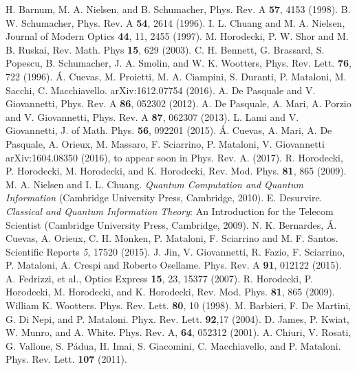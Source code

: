 \documentclass[aps,twocolumn,pra,superscriptaddress,showpacs,showkeys,floatfix]{revtex4-1}
\begin{document}
\begin{thebibliography}{99}
 H. Barnum, M. A. Nielsen, and B. Schumacher, Phys. Rev. A \textbf{57}, 4153 (1998).
 B. W. Schumacher, Phys. Rev. A \textbf{54}, 2614 (1996).
 I. L. Chuang and M. A. Nielsen, Journal of Modern Optics \textbf{44}, 11, 2455 (1997).
 M. Horodecki, P. W. Shor and M. B. Ruskai, Rev. Math. Phys  \textbf{15}, 629 (2003). %
 C. H. Bennett, G. Brassard, S. Popescu, B. Schumacher, J. A. Smolin, and W. K. Wootters, Phys. Rev. Lett. {\bf 76}, 722 (1996).
 \'A. Cuevas, M. Proietti, M. A. Ciampini, S. Duranti, P. Mataloni, M. Sacchi, C. Macchiavello. 	arXiv:1612.07754 (2016).
 A. De Pasquale and V. Giovannetti, Phys. Rev. A {\bf 86}, 052302 (2012).
 A. De Pasquale, A. Mari, A. Porzio and  V. Giovannetti, Phys. Rev. A {\bf 87}, 062307 (2013).
 L. Lami and V. Giovannetti, J. of Math. Phys. {\bf 56}, 092201 (2015).
 \'A. Cuevas, A. Mari, A. De Pasquale, A. Orieux, M. Massaro, F. Sciarrino, P. Mataloni, V. Giovannetti 	arXiv:1604.08350 (2016), to appear soon in Phys. Rev. A. (2017).
 R. Horodecki, P. Horodecki, M. Horodecki, and K. Horodecki, Rev. Mod. Phys. \textbf{81}, 865  (2009). 
 M. A. Nielsen and I. L. Chuang. \textit{Quantum Computation and Quantum Information} (Cambridge University Press, Cambridge, 2010).
 E. Desurvire. \textit{Classical and Quantum Information Theory}: An Introduction for the Telecom Scientist (Cambridge University Press, Cambridge, 2009).
 N. K. Bernardes, \'A. Cuevas, A. Orieux, C. H. Monken, P. Mataloni, F. Sciarrino and M. F. Santos. Scientific Reports \textit{5}, 17520 (2015).
 J. Jin, V. Giovannetti, R. Fazio, F. Sciarrino, P. Mataloni, A. Crespi and Roberto Osellame. Phys. Rev. A \textbf{91}, 012122 (2015).
 A. Fedrizzi, et al., Optics Express \textbf{15}, 23, 15377 (2007).
 R. Horodecki, P. Horodecki, M. Horodecki, and K. Horodecki, Rev. Mod. Phys. \textbf{81}, 865  (2009). 
 William K. Wootters. Phys. Rev. Lett. \textbf{80}, 10 (1998).
 M. Barbieri, F. De Martini, G. Di Nepi, and P. Mataloni. Phyx. Rev. Lett. \textbf{92},17 (2004). 
 D. James, P. Kwiat, W. Munro, and A. White. Phys. Rev. A, \textbf{64}, 052312 (2001).
 A. Chiuri, V. Rosati, G. Vallone, S. P\'adua, H. Imai, S. Giacomini, C. Macchiavello, and P. Mataloni. Phys. Rev. Lett. \textbf{107} (2011).


\end{thebibliography}
\end{document}
